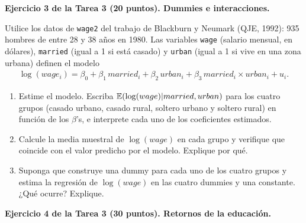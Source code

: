 \documentclass[letterpaper,11pt]{article}
\begin{document}
\vspace{1em}

\noindent\textbf{Ejercicio 3 de la Tarea 3 (20 puntos). Dummies e interacciones.}

Utilice los datos de \texttt{wage2} del trabajo de Blackburn y Neumark (QJE, 1992): 935
hombres de entre 28 y 38 años en 1980. Las variables \texttt{wage} (salario mensual, en
dólares), \texttt{married} (igual a 1 si está casado) y \texttt{urban} (igual a 1 si vive en
una zona urbana) definen el modelo
\begin{align*}
\log(wage_i)=\beta_0+\beta_1 \, married_i+\beta_2 \, urban_i+\beta_3 \, married_i\times urban_i+u_i.
\end{align*}
\begin{enumerate}
    \item Estime el modelo. Escriba $\operatorname{\mathbb{E}}(\log(wage)|married,urban)$ para los cuatro grupos
    (casado urbano, casado rural, soltero urbano y soltero rural) en función de los $\beta$'s,
    e interprete cada uno de los coeficientes estimados.
    \item Calcule la media muestral de $\log(wage)$ en cada grupo y verifique que coincide con
    el valor predicho por el modelo. Explique por qué.
    \item Suponga que construye una dummy para cada uno de los cuatro grupos y estima la
    regresión de $\log(wage)$ en las cuatro dummies y una constante. ¿Qué ocurre? Explique.
\end{enumerate}

\vspace{1em}

\noindent\textbf{Ejercicio 4 de la Tarea 3 (30 puntos). Retornos de la educación.}
\end{document}
